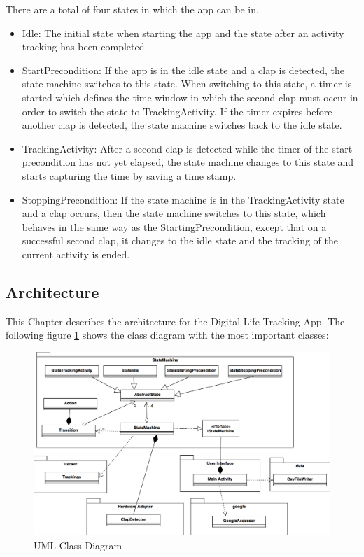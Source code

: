 There are a total of four states in which the app can be in. 
\begin{itemize}
\item Idle: The initial state when starting the app and the state after an activity tracking has been completed.
\item StartPrecondition: If the app is in the idle state and a clap is detected, the state machine switches to this state. When switching to this state, a timer is started which defines the time window in which the second clap must occur in order to switch the state to TrackingActivity. If the timer expires before another clap is detected, the state machine switches back to the idle state.
\item TrackingActivity: After a second clap is detected while the timer of the start precondition has not yet elapsed, the state machine changes to this state and starts capturing the time by saving a time stamp.
\item StoppingPrecondition: If the state machine is in the TrackingActivity state and a clap occurs, then the state machine switches to this state, which behaves in the same way as the StartingPrecondition, except that on a successful second clap, it changes to the idle state and the tracking of the current activity is ended.
\end{itemize}

\subsection{Architecture}
\label{sec:org393d659}
This Chapter describes the architecture for the Digital Life Tracking App. The following figure \ref{class-diagram} shows the class diagram with the most important classes:

\begin{figure}[H]
	\centering
	\includegraphics[width=1.0\linewidth]{./imgs/classUML.png}
	\caption[Caption for LOF]{UML Class Diagram}
	\label{class-diagram}
\end{figure}

